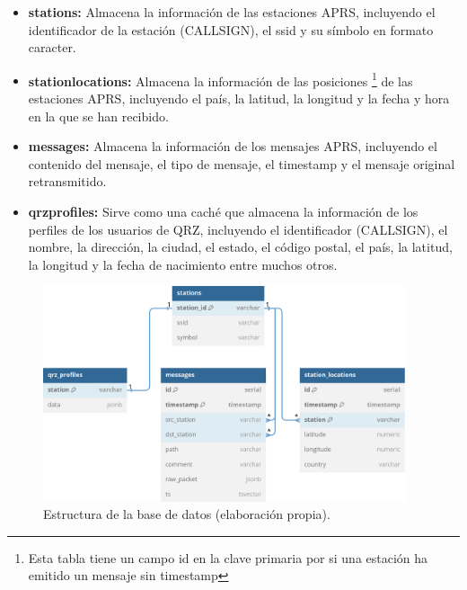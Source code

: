 \begin{itemize}
	\item \textbf{stations:} Almacena la información de las estaciones APRS, incluyendo el identificador de la estación (CALLSIGN), el ssid y su símbolo en formato caracter.
	\item \textbf{station\textunderscore locations:} Almacena la información de las posiciones \footnote[1]{Esta tabla tiene un campo id en la clave primaria por si una estación ha emitido un mensaje sin timestamp} de las estaciones APRS, incluyendo el país, la latitud, la longitud y la fecha y hora en la que se han recibido.
	\item \textbf{messages:} Almacena la información de los mensajes APRS, incluyendo el contenido del mensaje, el tipo de mensaje, el timestamp y el mensaje original retransmitido.
	\item \textbf{qrz\textunderscore profiles:} Sirve como una caché que almacena la información de los perfiles de los usuarios de QRZ, incluyendo el identificador (CALLSIGN), el nombre, la dirección, la ciudad, el estado, el código postal, el país, la latitud, la longitud y la fecha de nacimiento entre muchos otros.
\end{itemize}

\begin{figure}[h]
	\centering
	\includegraphics[width=0.95\textwidth]{Imagenes/Chapter_4/db_diagram.png}
	\caption[Estructura de la base de datos.]{Estructura de la base de datos (elaboración propia).}
	\label{fig:db-model}
\end{figure}

\FloatBarrier

